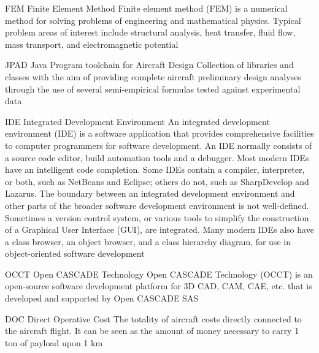   {FEM}                                                %
  {Finite Element Method}                      %
  {Finite element method (FEM) is a numerical method for solving problems of engineering and mathematical physics. Typical problem areas of interest include structural analysis, heat transfer, fluid flow, mass transport, and electromagnetic potential}   %
  
  {JPAD}                                                %
  {Java Program toolchain for Aircraft Design}  %
  {Collection of libraries and classes with the aim of providing complete aircraft preliminary design analyses through the use of several semi-empirical formulas tested against experimental data}            %
  
  {IDE}                                                  %
  {Integrated Development Environment}  %
  {An integrated development environment (IDE) is a software application that provides comprehensive facilities to computer programmers for software development. An IDE normally consists of a source code editor, build automation tools and a debugger. Most modern IDEs have an intelligent code completion. Some IDEs contain a compiler, interpreter, or both, such as NetBeans and Eclipse; others do not, such as SharpDevelop and Lazarus. The boundary between an integrated development environment and other parts of the broader software development environment is not well-defined. Sometimes a version control system, or various tools to simplify the construction of a Graphical User Interface (GUI), are integrated. Many modern IDEs also have a class browser, an object browser, and a class hierarchy diagram, for use in object-oriented software development}  %
  
  {OCCT}                                              %
  {Open CASCADE Technology}               %
  {Open CASCADE Technology (OCCT) is an open-source software development platform for 3D CAD, CAM, CAE, etc. that is developed and supported by Open CASCADE SAS}  %
  
  {DOC}                                                %
  {Direct Operative Cost}                        %
  {The totality of aircraft costs directly connected to the aircraft flight. It can be seen as the amount of money necessary to carry 1 ton of payload upon 1 km}
  
